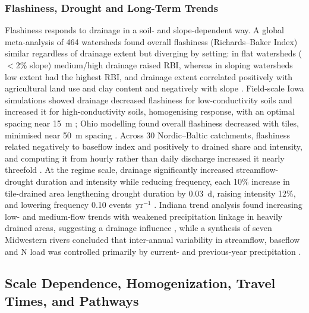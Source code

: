 \subsubsection{Flashiness, Drought and Long-Term Trends}

Flashiness responds to drainage in a soil- and slope-dependent way. A global meta-analysis of 464 watersheds found overall flashiness (Richards--Baker Index) similar regardless of drainage extent but diverging by setting: in flat watersheds ($<$2\% slope) medium/high drainage raised RBI, whereas in sloping watersheds low extent had the highest RBI, and drainage extent correlated positively with agricultural land use and clay content and negatively with slope \parencite{Zhou2025}. Field-scale Iowa simulations showed drainage decreased flashiness for low-conductivity soils and increased it for high-conductivity soils, homogenising response, with an optimal spacing near 15~m \parencite{Sloan2016}; Ohio modelling found overall flashiness decreased with tiles, minimised near 50~m spacing \parencite{Rathore2025}. Across 30 Nordic--Baltic catchments, flashiness related negatively to baseflow index and positively to drained share and intensity, and computing it from hourly rather than daily discharge increased it nearly threefold \parencite{Deelstra2014,Deelstra2014b}. At the regime scale, drainage significantly increased streamflow-drought duration and intensity while reducing frequency, each 10\% increase in tile-drained area lengthening drought duration by 0.03~d, raising intensity 12\%, and lowering frequency 0.10 events~yr$^{-1}$ \parencite{Adelsperger2024}. Indiana trend analysis found increasing low- and medium-flow trends with weakened precipitation linkage in heavily drained areas, suggesting a drainage influence \parencite{Kumar2009}, while a synthesis of seven Midwestern rivers concluded that inter-annual variability in streamflow, baseflow and N load was controlled primarily by current- and previous-year precipitation \parencite{Baeumler2020}.

\subsection{Scale Dependence, Homogenization, Travel Times, and Pathways}

